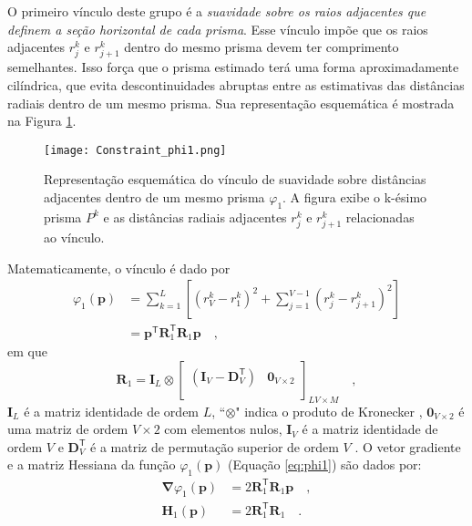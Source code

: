 O primeiro vínculo deste grupo é a \textit{suavidade sobre os raios adjacentes que definem a seção horizontal de cada prisma}. Esse vínculo impõe que os raios adjacentes $r_{j}^{k}$ e $r_{j+1}^{k}$ dentro do mesmo prisma devem ter comprimento semelhantes. Isso força que o prisma estimado terá uma forma aproximadamente cilíndrica, que evita descontinuidades abruptas entre as estimativas das distâncias radiais dentro de um mesmo prisma. Sua representação esquemática é mostrada na Figura \ref{fig:phi1}.

\begin{figure}[!htb]
	\centering
	\texttt{[image: Constraint\_phi1.png]}
	\caption{Representação esquemática do vínculo de suavidade sobre distâncias adjacentes dentro de um mesmo prisma $\varphi_{1}$. A figura exibe o k-ésimo prisma $P^k$ e as distâncias radiais adjacentes $r_j^k$ e $r_{j+1}^k$ relacionadas ao vínculo.}
	\label{fig:phi1}
\end{figure}

Matematicamente, o vínculo é dado por \begin{equation}\label{eq:phi1}
\begin{split}
\varphi_{1}(\mathbf{p}) &= \sum\limits^{L}_{k=1}\left[\left(r^{k}_{V}-r^{k}_{1}\right)^2 + \sum\limits^{V-1}_{j=1}\left(r^{k}_{j}-r^{k}_{j+1}\right)^2\right]\\
&= \mathbf{p}^{\mathsf{T}} \mathbf{R}^{\mathsf{T}}_{1}\mathbf{R}_{1} \mathbf{p} \quad ,
\end{split}
\end{equation}
em que
\begin{equation}
\mathbf{R}_{1} = 
\mathbf{I}_{L} \otimes 
\begin{bmatrix}
\left( \mathbf{I}_{V} - \mathbf{D}_{V}^\mathsf{T} \right) & \mathbf{0}_{V \times 2} \\
\end{bmatrix}_{LV \times M} \quad ,
\label{eq:S1-matrix}
\end{equation}
$\mathbf{I}_{L}$ é a matriz identidade de ordem $L$, ``$\otimes$" indica o produto de Kronecker \cite{}\cite[][ p. 243]{horn_johnson1991}, $\mathbf{0}_{V \times 2}$ é uma matriz de ordem $V \times 2$ com elementos nulos, 
$\mathbf{I}_{V}$ é a matriz identidade de ordem $V$ e $\mathbf{D}_{V}^\mathsf{T}$ é a matriz de permutação superior de ordem $V$ \cite[][ p. 20]{golub-vanloan2013}. O vetor gradiente e a matriz Hessiana da função $\varphi_{1}(\mathbf{p})$ (Equação \ref{eq:phi1}) são dados por:
\begin{equation}\label{eq:phi1_gh}
\begin{split}
\boldsymbol{\nabla}\varphi_{1}(\mathbf{p}) &= 2 \mathbf{R}^\mathsf{T}_{1}\mathbf{R}_{1}\mathbf{p} \quad , \\
\mathbf{H}_{1}(\mathbf{p}) &= 2\mathbf{R}^\mathsf{T}_{1}\mathbf{R}_{1} \quad .
\end{split}
\end{equation}

